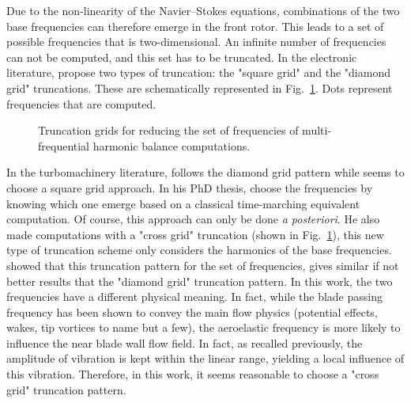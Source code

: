 Due to the non-linearity of the Navier--Stokes
equations, combinations of 
the two base frequencies can therefore emerge in the front rotor. 
This leads to a set of possible frequencies that 
is two-dimensional. An infinite number of frequencies
can not be computed, and this set 
has to be truncated. In the electronic literature,
\citet{Kundert1988} propose two types of truncation:
the "square grid" and the "diamond grid" truncations.
These are schematically represented in Fig.~\ref{fig:dream_hb_truncation}.
Dots represent frequencies that are computed.
\begin{figure}[htp]
  \centering
  \caption{Truncation grids for reducing the set of frequencies of multi-frequential
  harmonic balance computations.}
  \label{fig:dream_hb_truncation}
\end{figure}
In the turbomachinery literature, \citet{Gopinath2007} follows the
diamond grid pattern while \citet{Ekici2007} seems to choose a
square grid approach. In his PhD thesis, \citet{ThesisGuedeney}
choose the frequencies by knowing which one emerge based on
a classical time-marching equivalent computation. Of course,
this approach can only be done \emph{a posteriori}. He
also made computations with a "cross grid" truncation 
(shown in Fig.~\ref{fig:dream_hb_truncation}), this new type 
of truncation scheme only considers the harmonics of the
base frequencies. \citet{ThesisGuedeney} showed that this
truncation pattern for the set of frequencies, gives
similar if not better results that the
"diamond grid" truncation pattern. In this work, the two frequencies 
have a different physical meaning. In fact, while the blade passing frequency
has been shown to convey the main flow physics (potential effects, wakes, 
tip vortices to name but a few), the aeroelastic frequency is more likely
to influence the near blade wall flow field. In fact, as recalled
previously, the amplitude of vibration is kept within the linear range,
yielding a local influence of this vibration.
Therefore, in this work, it seems reasonable to choose a "cross grid"
truncation pattern.
